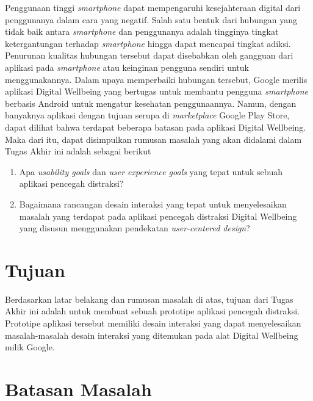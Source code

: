 Penggunaan tinggi \textit{smartphone} dapat mempengaruhi kesejahteraan digital dari penggunanya dalam cara yang negatif. Salah satu bentuk dari hubungan yang tidak baik antara \textit{smartphone} dan penggunanya adalah tingginya tingkat ketergantungan terhadap \textit{smartphone} hingga dapat mencapai tingkat adiksi. Penurunan kualitas hubungan tersebut dapat disebabkan oleh gangguan dari aplikasi pada \textit{smartphone} atau keinginan pengguna sendiri untuk menggunakannya. Dalam upaya memperbaiki hubungan tersebut, Google merilis aplikasi Digital Wellbeing yang bertugas untuk membantu pengguna \textit{smartphone} berbasis Android untuk mengatur kesehatan penggunaannya. Namun, dengan banyaknya aplikasi dengan tujuan serupa di \textit{marketplace} Google Play Store, dapat dilihat bahwa terdapat beberapa batasan pada aplikasi Digital Wellbeing. Maka dari itu, dapat disimpulkan rumusan masalah yang akan didalami dalam Tugas Akhir ini adalah sebagai berikut

\begin{enumerate}
  \item Apa \textit{usability goals} dan \textit{user experience goals} yang tepat untuk sebuah aplikasi pencegah distraksi?
  \item Bagaimana rancangan desain interaksi yang tepat untuk menyelesaikan masalah yang terdapat pada aplikasi pencegah distraksi Digital Wellbeing yang disusun menggunakan pendekatan \textit{user-centered design}?
\end{enumerate}

\section{Tujuan}

Berdasarkan latar belakang dan rumusan masalah di atas, tujuan dari Tugas Akhir ini adalah untuk membuat sebuah prototipe aplikasi pencegah distraksi. Prototipe aplikasi tersebut memiliki desain interaksi yang dapat menyelesaikan masalah-masalah desain interaksi yang ditemukan pada alat Digital Wellbeing milik Google.


\section{Batasan Masalah}

